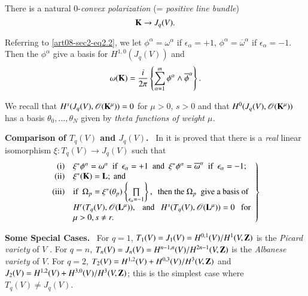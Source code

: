 There is a natural $0$-{\em convex polarization} (= {\em positive line bundle})
\begin{equation}
\mathbf{K}\to J_{q}(V).\label{art08-sec2-eq2.4}
\end{equation}

Referring to \eqref{art08-sec2-eq2.2}, we let $\phi^{\alpha}=\omega^{\alpha}$ if $\epsilon_{\alpha}=+1$, $\phi^{\alpha}=\overline{\omega}^{\alpha}$ if $\epsilon_{\alpha}=-1$. Then the $\phi^{\alpha}$ give a basis for $H^{1,0}(J_{q}(V))$ and
\begin{equation}
\omega (\mathbf{K})=\dfrac{i}{2\pi}\left\{\sum\limits^{m}_{\alpha=1}\phi^{\alpha}\wedge \overline{\phi}^{\alpha}\right\}.\label{art08-sec2-eq2.5}
\end{equation}

We recall \cite{art08-cite23} that $H^{s}(J_{q}(V),\mathscr{O}(\mathbf{K}^{\mu}))=0$ for $\mu>0$, $s>0$ and that $H^{0}(J_{q}(V),\mathscr{O}(\mathbf{K}^{\mu}))$ has a basis $\theta_{0},\ldots,\theta_{N}$ given by {\em theta functions of weight $\mu$.}

\medskip
\noindent
{\bf Comparison of $T_{q}(V)$ and $J_{q}(V)$.}~ In \cite{art08-key9} it is proved that there is a {\em real} linear isomorphism $\xi:T_{q}(V)\to J_{q}(V)$ such that
\begin{equation}
\left.
\begin{array}[l]{@{}rl}
{\rm(i)} & \xi^{*}\phi^{\alpha}=\omega^{\alpha}\text{~ if~ } \epsilon_{\alpha}=+1\text{~ and~ } \xi^{*}\phi^{\alpha}=\overline{\omega}^{\alpha}\text{~ if~ } \epsilon_{\alpha}=-1;\\
{\rm(ii)} & \xi^{*}(\bfK)=\bfL;~ \text{and}\\
{\rm(iii)} & \text{if~~} \Omega_{p}=\xi^{*}(\theta_{p})\left\{\prod\limits_{\epsilon_{\alpha}=-1}\right\}, \text{~ then the } \Omega_{p}\text{~ give a basis of}\\
 & H^{r}(T_{q}(V),\mathscr{O}(\bfL^{\mu})),\text{~~ and~~ }H^{s}(T_{q}(V),\mathscr{O}(\bfL^{\mu}))=0\text{~~ for}\\
& \mu>0, s\neq r.
\end{array}
\right\}\label{art08-sec2-eq2.6}
\end{equation}

\noindent
{\bf Some Special Cases.}~ For $q=1$, $T_{1}(V)=J_{1}(V)=H^{0,1}(V)/H^{1}(V,\mathbf{Z})$ is the {\em Picard variety} of $V$ \cite{art08-key22}. For $q=n$, $T_{n}(V)=J_{n}(V)=H^{n-1,n}(V)/H^{2n-1}(V,\mathbf{Z})$ is the {\em Albanese variety} \cite{art08-key3} of $V$. For $q=2$, $T_{2}(V)=H^{1,2}(V)+H^{0,3}(V)/H^{3}(V,\mathbf{Z})$ and $J_{2}(V)=H^{1,2}(V)+H^{3,0}(V)/H^{3}(V,\mathbf{Z})$; this is the simplest case where $T_{q}(V)\neq J_{q}(V)$.

